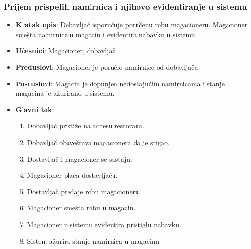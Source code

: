   \subsubsection{Prijem prispelih namirnica i njihovo evidentiranje u sistemu}
 \begin{itemize}
    \item \textbf{Kratak opis}:
   Dobavljač isporučuje poručenu robu magacioneru. Magacioner smešta namirnice u magacin i evidentira nabavku u sistemu.
    \item \textbf{Učesnici}:
    Magacioner, dobavljač
    \item \textbf{Preduslovi}:
    Magacioner je poručio namirnice od dobavljača.
    \item \textbf{Postuslovi}:
    Magacin je dopunjen nedostajućim namirnicama i stanje magacina je ažurirano u sistemu. 
    \item \textbf{Glavni tok}:
    \begin{enumerate}
        \item Dobavljač pristiže na adresu restorana.
        \item Dobavljač obaveštava magacionera da je stigao.
        \item Dostavljač i magacioner se sastaju.
        \item Magacioner plaća dostavljaču.
        \item Dostavljač predaje robu magacioneru.
        \item Magacioner smešta robu u magacin.
        \item Magacioner u sistemu evidentira pristiglu nabavku.
        \item Sistem ažurira stanje namirnica u magacinu.  
        
    \end{enumerate}

\end{itemize}
 
